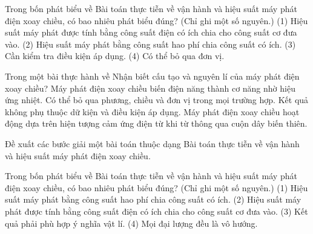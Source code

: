\begin{ex}
Trong bốn phát biểu về Bài toán thực tiễn về vận hành và hiệu suất máy phát điện xoay chiều, có bao nhiêu phát biểu đúng? (Chỉ ghi một số nguyên.) (1) Hiệu suất máy phát được tính bằng công suất điện có ích chia cho công suất cơ đưa vào. (2) Hiệu suất máy phát bằng công suất hao phí chia công suất có ích. (3) Cần kiểm tra điều kiện áp dụng. (4) Có thể bỏ qua đơn vị.
\end{ex}

\begin{ex}
Trong một bài thực hành về Nhận biết cấu tạo và nguyên lí của máy phát điện xoay chiều?
\choice
{Máy phát điện xoay chiều biến điện năng thành cơ năng nhờ hiệu ứng nhiệt.}
{Có thể bỏ qua phương, chiều và đơn vị trong mọi trường hợp.}
{Kết quả không phụ thuộc dữ kiện và điều kiện áp dụng.}
{\True Máy phát điện xoay chiều hoạt động dựa trên hiện tượng cảm ứng điện từ khi từ thông qua cuộn dây biến thiên.}
\end{ex}

\begin{bt}
Đề xuất các bước giải một bài toán thuộc dạng Bài toán thực tiễn về vận hành và hiệu suất máy phát điện xoay chiều.
\end{bt}

\begin{ex}
Trong bốn phát biểu về Bài toán thực tiễn về vận hành và hiệu suất máy phát điện xoay chiều, có bao nhiêu phát biểu đúng? (Chỉ ghi một số nguyên.) (1) Hiệu suất máy phát bằng công suất hao phí chia công suất có ích. (2) Hiệu suất máy phát được tính bằng công suất điện có ích chia cho công suất cơ đưa vào. (3) Kết quả phải phù hợp ý nghĩa vật lí. (4) Mọi đại lượng đều là vô hướng.
\end{ex}

